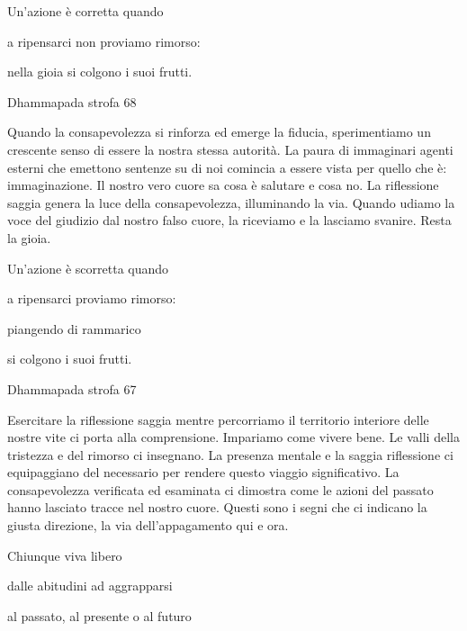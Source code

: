 \documentclass[a4paper,portrait,12pt]{article}
\begin{document}
\newpage



Un'azione \`{e} corretta quando


a ripensarci non proviamo rimorso:


nella gioia si colgono i suoi frutti.





Dhammapada strofa 68


\newpage



Quando la consapevolezza si rinforza ed emerge la fiducia, sperimentiamo un crescente senso di essere la nostra stessa autorit\`{a}. La paura di immaginari agenti esterni che emettono sentenze su di noi comincia a essere vista per quello che \`{e}: immaginazione. Il nostro vero cuore sa cosa \`{e} salutare e cosa no. La riflessione saggia genera la luce della consapevolezza, illuminando la via. Quando udiamo la voce del giudizio dal nostro falso cuore, la riceviamo e la lasciamo svanire. Resta la gioia.


\newpage



Un'azione \`{e} scorretta quando


a ripensarci proviamo rimorso:


piangendo di rammarico


si colgono i suoi frutti.





Dhammapada strofa 67


\newpage



Esercitare la riflessione saggia mentre percorriamo il territorio interiore delle nostre vite ci porta alla comprensione. Impariamo come vivere bene. Le valli della tristezza e del rimorso ci insegnano. La presenza mentale e la saggia riflessione ci equipaggiano del necessario per rendere questo viaggio significativo. La consapevolezza verificata ed esaminata ci dimostra come le azioni del passato hanno lasciato tracce nel nostro cuore. Questi sono i segni che ci indicano la giusta direzione, la via dell'appagamento qui e ora.


\newpage



Chiunque viva libero


dalle abitudini ad aggrapparsi


al passato, al presente o al futuro
\end{document}
